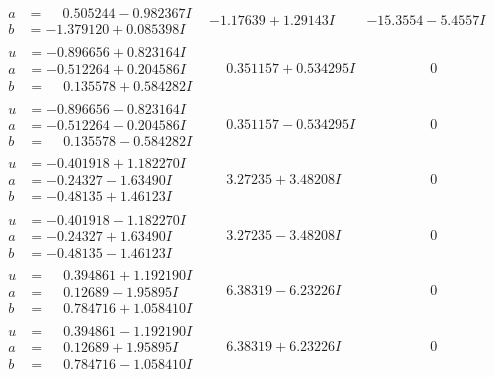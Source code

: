 \documentclass[1p]{elsarticle_modified}
\theoremstyle{definition}
\begin{document}
$$\begin{array}{c|c|c}
\begin{aligned}
a &= \phantom{-}0.505244 - 0.982367 I \\
b &= -1.379120 + 0.085398 I\end{aligned}
 & -1.17639 + 1.29143 I & -15.3554 - 5.4557 I \\ \hline\begin{aligned}
u &= -0.896656 + 0.823164 I \\
a &= -0.512264 + 0.204586 I \\
b &= \phantom{-}0.135578 + 0.584282 I\end{aligned}
 & \phantom{-}0.351157 + 0.534295 I & \phantom{-0.000000 } 0 \\ \hline\begin{aligned}
u &= -0.896656 - 0.823164 I \\
a &= -0.512264 - 0.204586 I \\
b &= \phantom{-}0.135578 - 0.584282 I\end{aligned}
 & \phantom{-}0.351157 - 0.534295 I & \phantom{-0.000000 } 0 \\ \hline\begin{aligned}
u &= -0.401918 + 1.182270 I \\
a &= -0.24327 - 1.63490 I \\
b &= -0.48135 + 1.46123 I\end{aligned}
 & \phantom{-}3.27235 + 3.48208 I & \phantom{-0.000000 } 0 \\ \hline\begin{aligned}
u &= -0.401918 - 1.182270 I \\
a &= -0.24327 + 1.63490 I \\
b &= -0.48135 - 1.46123 I\end{aligned}
 & \phantom{-}3.27235 - 3.48208 I & \phantom{-0.000000 } 0 \\ \hline\begin{aligned}
u &= \phantom{-}0.394861 + 1.192190 I \\
a &= \phantom{-}0.12689 - 1.95895 I \\
b &= \phantom{-}0.784716 + 1.058410 I\end{aligned}
 & \phantom{-}6.38319 - 6.23226 I & \phantom{-0.000000 } 0 \\ \hline\begin{aligned}
u &= \phantom{-}0.394861 - 1.192190 I \\
a &= \phantom{-}0.12689 + 1.95895 I \\
b &= \phantom{-}0.784716 - 1.058410 I\end{aligned}
 & \phantom{-}6.38319 + 6.23226 I & \phantom{-0.000000 } 0\\

\end{array}$$
\end{document}
